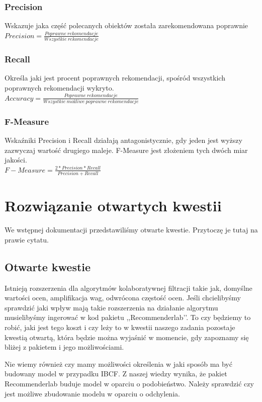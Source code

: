 \documentclass[12pt, a4paper]{article}
\begin{document}
\subsubsection{Precision}
Wskazuje jaka część polecanych obiektów została zarekomendowana poprawnie\\
$Precision = \frac{Poprawne \:rekomendacje}{Wszystkie\: rekomendacje}$
\subsubsection{Recall}
Określa jaki jest procent poprawnych rekomendacji, spośród wszystkich poprawnych rekomendacji wykryto.\\
$Accuracy = \frac{Poprawne\:rekomendacje}{Wszystkie \:możliwe \:poprawne\: rekomendacje}$
\subsubsection{F-Measure}
Wskaźniki Precision i Recall działają antagonistycznie, gdy jeden jest wyższy zazwyczaj wartość drugiego maleje. F-Measure jest złożeniem tych dwóch miar jakości.\\
$F-Measure = \frac{2*Precision*Recall}{Precision + Recall}$


\section{Rozwiązanie otwartych kwestii}
We wstępnej dokumentacji przedstawiliśmy otwarte kwestie. Przytoczę je tutaj na prawie cytatu.

\subsection{Otwarte kwestie}
Istnieją rozszerzenia dla algorytmów kolaboratywnej filtracji takie jak, domyślne wartości ocen, amplifikacja wag, odwrócona częstość ocen. Jeśli chcielibyśmy sprawdzić jaki wpływ mają takie rozszerzenia na działanie algorytmu musielibyśmy ingerować w kod pakietu ,,Recommenderlab’’. To czy będziemy to robić, jaki jest tego koszt i czy leży to w kwestii naszego zadania pozostaje kwestią otwartą, która będzie można wyjaśnić w momencie, gdy zapoznamy się bliżej z pakietem i jego możliwościami.

Nie wiemy również czy mamy możliwości określenia w jaki sposób ma być budowany model w przypadku IBCF. Z naszej wiedzy wynika, że pakiet Recommenderlab buduje model w oparciu o podobieństwo. Należy sprawdzić czy jest możliwe zbudowanie modelu w oparciu o odchylenia.
\end{document}
